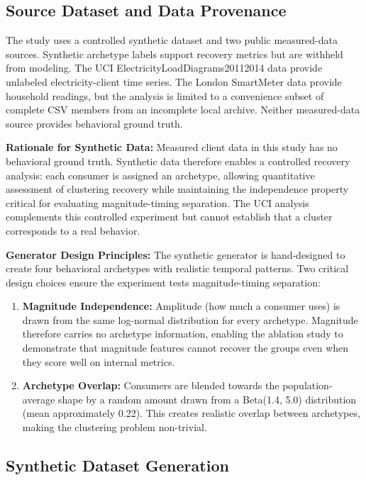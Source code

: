 \documentclass[11pt,a4paper]{article}
\begin{document}
\subsection{Source Dataset and Data Provenance}
\label{sec:provenance}

The study uses a controlled synthetic dataset and two public measured-data sources. Synthetic archetype labels support recovery metrics but are withheld from modeling. The UCI ElectricityLoadDiagrams20112014 data provide unlabeled electricity-client time series. The London SmartMeter data provide household readings, but the analysis is limited to a convenience subset of complete CSV members from an incomplete local archive. Neither measured-data source provides behavioral ground truth.

\textbf{Rationale for Synthetic Data:} Measured client data in this study has no behavioral ground truth. Synthetic data therefore enables a controlled recovery analysis: each consumer is assigned an archetype, allowing quantitative assessment of clustering recovery while maintaining the independence property critical for evaluating magnitude-timing separation. The UCI analysis complements this controlled experiment but cannot establish that a cluster corresponds to a real behavior.

\textbf{Generator Design Principles:} The synthetic generator is hand-designed to create four behavioral archetypes with realistic temporal patterns. Two critical design choices ensure the experiment tests magnitude-timing separation:

\begin{enumerate}
    \item \textbf{Magnitude Independence:} Amplitude (how much a consumer uses) is drawn from the same log-normal distribution for every archetype. Magnitude therefore carries no archetype information, enabling the ablation study to demonstrate that magnitude features cannot recover the groups even when they score well on internal metrics.
    
    \item \textbf{Archetype Overlap:} Consumers are blended towards the population-average shape by a random amount drawn from a Beta(1.4, 5.0) distribution (mean approximately 0.22). This creates realistic overlap between archetypes, making the clustering problem non-trivial.
\end{enumerate}

\subsection{Synthetic Dataset Generation}
\label{sec:synthesis}
\end{document}
